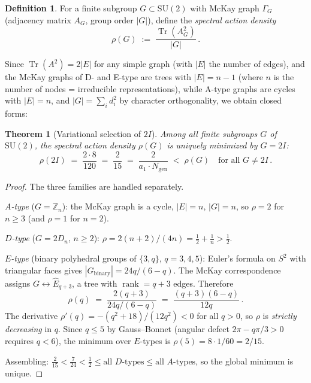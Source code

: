 \documentclass[12pt,a4paper]{article}
\newtheorem{theorem}{Theorem}
\theoremstyle{definition}
\newtheorem{definition}{Definition}
\begin{document}
\begin{definition}
For a finite subgroup $G \subset \mathrm{SU}(2)$ with McKay graph $\Gamma_G$ (adjacency matrix $A_G$, group order $|G|$), define the \emph{spectral action density}
\begin{equation}
\rho(G) \;:=\; \frac{\operatorname{Tr}(A_G^2)}{|G|}\,.
\end{equation}
\end{definition}

\noindent Since $\operatorname{Tr}(A^2) = 2|E|$ for any simple graph (with $|E|$ the number of edges), and the McKay graphs of D- and E-type are trees with $|E| = n - 1$ (where $n$ is the number of nodes = irreducible representations), while A-type graphs are cycles with $|E| = n$, and $|G| = \sum_i d_i^2$ by character orthogonality, we obtain closed forms:

\begin{theorem}[Variational selection of $2I$]
\label{thm:S-variational}
Among all finite subgroups $G$ of $\mathrm{SU}(2)$, the spectral action density $\rho(G)$ is uniquely minimized by $G = 2I$:
\[
\rho(2I) \;=\; \frac{2 \cdot 8}{120} \;=\; \frac{2}{15} \;=\; \frac{2}{a_1 \cdot N_{\mathrm{gen}}} \;<\; \rho(G) \quad \text{for all } G \neq 2I\,.
\]
\end{theorem}

\begin{proof}
The three families are handled separately.

\emph{$A$-type} ($G = \mathbb{Z}_n$): the McKay graph is a cycle, $|E| = n$, $|G| = n$, so $\rho = 2$ for $n \geq 3$ (and $\rho = 1$ for $n = 2$).

\emph{$D$-type} ($G = 2D_n$, $n \geq 2$): $\rho = 2(n+2)/(4n) = \tfrac{1}{2} + \tfrac{1}{n} > \tfrac{1}{2}$.

\emph{$E$-type} (binary polyhedral groups of $\{3,q\}$, $q = 3,4,5$):
Euler's formula on $S^2$ with triangular faces gives $|G_{\mathrm{binary}}| = 24q/(6-q)$.  The McKay correspondence assigns $G \leftrightarrow \hat{E}_{q+3}$, a tree with $\operatorname{rank} = q + 3$ edges.  Therefore
\begin{equation}
\label{eq:rho-q}
\rho(q) \;=\; \frac{2(q+3)}{24q/(6-q)} \;=\; \frac{(q+3)(6-q)}{12q}\,.
\end{equation}
The derivative $\rho'(q) = -(q^2 + 18)/(12q^2) < 0$ for all $q > 0$, so $\rho$ is \emph{strictly decreasing} in $q$.  Since $q \leq 5$ by Gauss--Bonnet (angular defect $2\pi - q\pi/3 > 0$ requires $q < 6$), the minimum over $E$-types is $\rho(5) = 8 \cdot 1 / 60 = 2/15$.

Assembling: $\tfrac{2}{15} < \tfrac{7}{24} < \tfrac{1}{2} \leq \text{all $D$-types} \leq \text{all $A$-types}$, so the global minimum is unique.
\end{proof}
\end{document}
